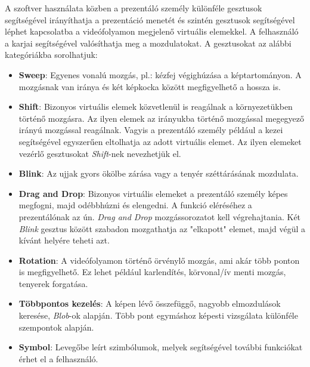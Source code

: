 

A szoftver használata közben a prezentáló személy különféle gesztusok segítségével irányíthatja a prezentáció menetét és szintén gesztusok segítségével léphet kapcsolatba a videófolyamon megjelenő virtuális elemekkel. A felhasználó a karjai segítségével valósíthatja meg a mozdulatokat. A gesztusokat az alábbi kategóriákba sorolhatjuk:

\begin{itemize}
	\item \textbf{Sweep}: Egyenes vonalú mozgás, pl.: kézfej végighúzása a képtartományon. A mozgásnak van iránya és két képkocka között megfigyelhető a hossza is.
	\item \textbf{Shift}: Bizonyos virtuális elemek közvetlenül is reagálnak a környezetükben történő mozgásra. Az ilyen elemek az irányukba történő mozgással megegyező irányú mozgással reagálnak. Vagyis a prezentáló személy például a kezei segítségével egyszerűen eltolhatja az adott virtuális elemet. Az ilyen elemeket vezérlő gesztusokat \textit{Shift}-nek nevezhetjük el.
	\item \textbf{Blink}: Az ujjak gyors ökölbe zárása vagy a tenyér széttárásának mozdulata.
	\item \textbf{Drag and Drop}: Bizonyos virtuális elemeket a prezentáló személy képes megfogni, majd odébbhúzni és elengedni. A funkció eléréséhez a prezentálónak az ún. \textit{Drag and Drop} mozgássorozatot kell végrehajtania. Két \textit{Blink} gesztus között szabadon mozgathatja az "elkapott" elemet, majd végül a kívánt helyére teheti azt.
	\item \textbf{Rotation}: A videófolyamon történő örvénylő mozgás, ami akár több ponton is megfigyelhető. Ez lehet például karlendítés, körvonal/ív menti mozgás, tenyerek forgatása.
	\item \textbf{Többpontos kezelés}: A képen lévő összefüggő, nagyobb elmozdulások keresése, \textit{Blob}-ok alapján. Több pont egymáshoz képesti vizsgálata különféle szempontok alapján.
	\item \textbf{Symbol}: Levegőbe leírt szimbólumok, melyek segítségével további funkciókat érhet el a felhasználó.
\end{itemize}



